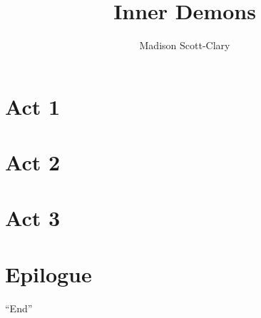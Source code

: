 \documentclass[12pt,letterpaper,oneside]{memoir}
\title{Inner Demons}
\author{Madison Scott-Clary}
\begin{document}
  \maketitle

  \newpage

  \tableofcontents

  \part{Act 1}
  

  \part{Act 2}
  
  

  \part{Act 3}
  
  
  
  

  \part{Epilogue}
  

  \begin{center}
    ``End''
  \end{center}
\end{document}
